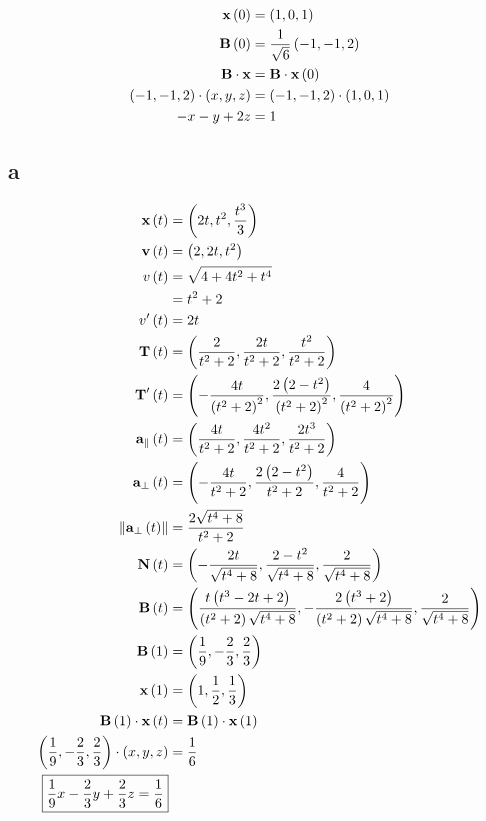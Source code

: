 \documentclass{article}
\begin{document}
\begin{align*}
  \textbf{x} \left ( 0 \right) &= \left ( 1, 0, 1 \right) \\
  \textbf{B} \left ( 0 \right) &= \frac{1}{\sqrt{6}} \left ( -1, -1, 2 \right) \\
  \textbf{B} \cdot \textbf{x} &= \textbf{B} \cdot \textbf{x} \left ( 0 \right) \\
  \left ( -1, -1, 2 \right) \cdot \left ( x, y, z \right) &= \left ( -1, -1, 2 \right) \cdot \left ( 1, 0, 1 \right) \\
  -x - y + 2z &= 1 \\
\end{align*}



\subsection*{a}

\begin{align*}
  \textbf{x} \left ( t \right) &= \left ( 2t, t^2, \frac{t^3}{3} \right) \\
  \textbf{v} \left ( t \right) &= \left ( 2, 2t, t^2 \right) \\
  v \left ( t \right) &= \sqrt{4 + 4t^2 + t^4} \\
                  &= t^2 + 2 \\
  v' \left ( t \right) &= 2t \\
  \textbf{T} \left ( t \right) &= \left ( \frac{2}{t^2+2}, \frac{2t}{t^2+2}, \frac{t^2}{t^2+2} \right) \\
  \textbf{T}' \left ( t \right) &= \left ( - \frac{4t}{\left ( t^2+2 \right)^2}, \frac{2 \left ( 2- t^2 \right)}{\left ( t^2+2 \right)^2}, \frac{4}{\left ( t^2+2 \right)^2} \right) \\
  \textbf{a}_{\parallel} \left ( t \right) &= \left ( \frac{4t}{t^2+2}, \frac{4t^2}{t^2+2}, \frac{2t^3}{t^2+2} \right) \\
  \textbf{a}_{\perp} \left ( t \right) &= \left ( - \frac{4t}{t^2 + 2}, \frac{2 \left ( 2-t^2 \right)}{t^2 + 2}, \frac{4}{t^2 + 2} \right) \\
  \left\lVert\textbf{a}_{\perp} \left ( t \right)\right\rVert &= \frac{2 \sqrt{t^4 + 8}}{t^2 + 2} \\
  \textbf{N} \left ( t \right) &= \left ( -\frac{2t}{\sqrt{t^4 + 8}}, \frac{2-t^2}{\sqrt{t^4 + 8}}, \frac{2}{\sqrt{t^4 + 8}} \right) \\
  \textbf{B} \left ( t \right) &= \left ( \frac{t \left ( t^3 - 2t + 2 \right)}{\left ( t^2 + 2 \right) \sqrt{t^4 + 8}}, - \frac{2 \left ( t^3 + 2 \right)}{\left ( t^2 + 2 \right) \sqrt{t^4 + 8}}, \frac{2}{\sqrt{t^4 + 8}}  \right) \\
  \textbf{B} \left ( 1 \right) &= \left ( \frac{1}{9}, - \frac{2}{3}, \frac{2}{3} \right) \\
  \textbf{x} \left ( 1 \right) &= \left ( 1, \frac{1}{2}, \frac{1}{3} \right) \\
  \textbf{B} \left ( 1 \right) \cdot \textbf{x} \left ( t \right) &= \textbf{B} \left ( 1 \right) \cdot \textbf{x} \left ( 1 \right) \\
  \left ( \frac{1}{9}, - \frac{2}{3}, \frac{2}{3} \right) \cdot \left ( x, y, z \right) &= \frac{1}{6} \\
  \boxed{\frac{1}{9} x - \frac{2}{3} y + \frac{2}{3} z = \frac{1}{6}} \\
\end{align*}
\end{document}
